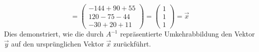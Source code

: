 \[ = \begin{pmatrix}
        -144 + 90 + 55 \\
        120 - 75 - 44  \\
        -30 + 20 + 11
    \end{pmatrix} =
    \begin{pmatrix} 1 \\ 1 \\ 1 \end{pmatrix} = \vec{x} \]
Dies demonstriert, wie die durch \(A^{-1}\) repräsentierte Umkehrabbildung den
Vektor \(\vec{y}\) auf den ursprünglichen Vektor \(\vec{x}\) zurückführt.